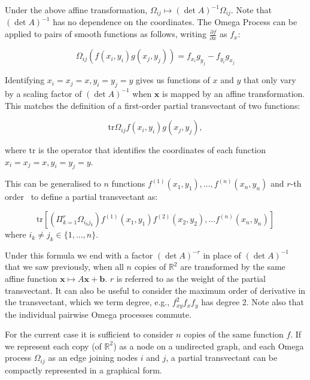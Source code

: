 \documentclass[review,onefignum,onetabnum]{siamonline190516}
\begin{document}
{Under the above affine transformation, $\Omega_{ij} \mapsto (\det A)^{-1}
\Omega_{ij}$. Note that $(\det A)^{-1}$ has no dependence on the coordinates.
The Omega Process can be applied to pairs of smooth functions as follows,
writing $\frac{\partial f}{\partial x}$ as $f_x$:

\begin{equation}
\Omega_{ij} \left(f(x_i, y_i) g(x_j, y_j)\right) = f_{x_i}g_{y_j} - f_{y_i}g_{x_j}
\end{equation}

Identifying $x_i = x_j = x, y_i = y_j = y$ gives us functions of $x$ and $y$
that only vary by a scaling factor of $(\det A)^{-1}$ when $\mathbf{x}$ is
mapped by an affine transformation. This matches the definition of a
first-order partial transvectant of two functions:

\begin{equation}
\mbox{tr} \Omega_{ij} f(x_i, y_i) g(x_j, y_j),
\end{equation}

\noindent where $\mbox{tr}$  is the operator that identifies the coordinates of each function $x_i = x_j = x, y_i = y_j = y$.

This can be generalised to $n$ functions $f^{(1)}(x_1, y_1), \ldots, f^{(n)}(x_n, y_n)$ and $r$-th order~\cite{Olver} to define a partial transvectant as:

\begin{equation}
\mbox{tr} \left[\left( \Pi_{k=1}^r \Omega_{i_k j_k} \right) f^{(1)}(x_1, y_1)
f^{(2)}(x_2, y_2), \ldots f^{(n)} (x_n, y_n)\right]
\end{equation}
where $i_k \neq j_k \in \{1, \ldots, n\}$.

Under this formula we end with a factor $(\det A)^{-r}$ in place of $(\det
A)^{-1}$ that we saw previously, when all $n$ copies of $\mathbb{R}^2$ are
transformed by the same affine function $\mathbf{x} \mapsto A\mathbf{x} +
\mathbf{b}$. $r$ is referred to as the weight of the partial
transvectant. It can also be useful to consider the maximum order of
derivative in the transvectant, which we term degree, e.g., $f_{xy}^2 f_x
f_y$ has degree 2. Note also that the individual pairwise Omega processes commute.

For the current case it is sufficient to consider $n$ copies of the same
function $f$. If we represent each copy (of $\mathbb{R}^2$) as a node on a
undirected graph, and each Omega process $\Omega_{ij}$ as an edge joining
nodes $i$ and $j$, a partial transvectant can be compactly represented in a
graphical form. 

}
\end{document}
